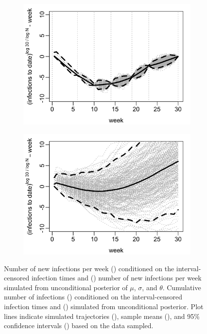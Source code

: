 \documentclass{uwstat572}
\newcommand{\greyline}{\raisebox{2pt}{\tikz{\draw[-,gray,solid,line width = 1.5pt](0,0) -- (8mm,0);}}}
\newcommand{\blackline}{\raisebox{2pt}{\tikz{\draw[-,black,solid,line width = 1.5pt](0,0) -- (8mm,0);}}}
\newcommand{\blackdashline}{\raisebox{2pt}{\tikz{\draw[-,black,dashed,line width = 1.5pt](0,0) -- (8mm,0);}}}
\begin{document}
\begin{figure}[t!]
\begin{subfigure}[b]{0.49\textwidth}
		\includegraphics[width=\textwidth]{figures/figure_4c.png}
		\caption{}
		\label{fig:cum_cond_infections}
	\end{subfigure}
	\hfill
	\begin{subfigure}[b]{0.49\textwidth}
		\includegraphics[width=\textwidth]{figures/figure_4d.png}
		\caption{}
		\label{fig:cum_sim_infection}
	\end{subfigure}
	\caption{Number of new infections per week () conditioned on the interval-censored infection times and () number of new infections per week simulated from unconditional posterior of $\mu$, $\sigma$, and $\theta$. Cumulative number of infections () conditioned on the interval-censored infection times and () simulated from unconditional posterior. Plot lines indicate simulated trajectories (\protect\greyline), sample means (\protect\blackline), and 95\% confidence intervals (\protect\blackdashline) based on the data sampled. }
	\label{fig:sim_epidemic}
\end{figure} 
\end{document}
